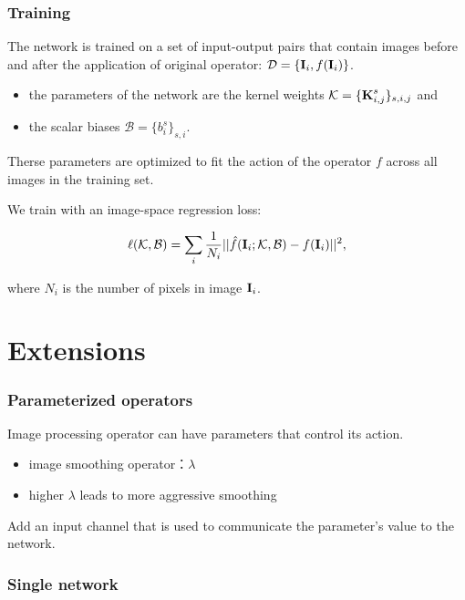 \documentclass{article}
\newcommand{\tb}{\textbf}
\begin{document}
\subsubsection*{Training}

The network is trained on a set of input-output pairs that contain images before and after the application of original operator: $\mathcal D = \{\tb I_i, f(\tb I_i)\}$.

\begin{itemize}
    \item the parameters of the network are the kernel weights $\mathcal K = \{\tb K_{i, j}^s\}_{s, i, j}$ and
    \item the scalar biases $\mathcal B = \{b_i^s\}_{s, i}$.
\end{itemize}

Therse parameters are optimized to fit the action of the operator $f$ across all images in the training set.

We train with an image-space regression loss:

$$\ell(\mathcal K, \mathcal B) = \sum\limits_i \frac{1}{N_i} ||\hat f(\tb I_i; \mathcal K, \mathcal B) - f(\tb I_i)||^2,$$

where $N_i$ is the number of pixels in image $\tb I_i$.

\section*{Extensions}

\subsubsection*{Parameterized operators}

Image processing operator can have parameters that control its action.

\begin{itemize}
    \item image smoothing operator：$\lambda$
    \item higher $\lambda$ leads to more aggressive smoothing
\end{itemize}

Add an input channel that is used to communicate the parameter's value to the network.

\subsubsection*{Single network}
\end{document}
